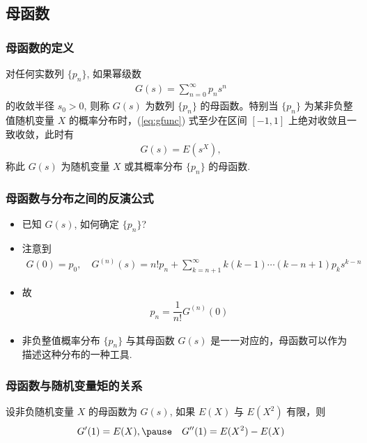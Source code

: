 \subsection{母函数}
\begin{frame}
	\frametitle{母函数的定义}
	\begin{defi}
		对任何实数列 $\{p_n\}$, 如果幂级数
		\begin{eqnarray}\label{eq:gfunc}
			G(s)=\sum_{n=0}^\infty p_ns^n
		\end{eqnarray}
		的收敛半径 $s_0>0$, 则称 $G (s)$ 为数列 $\{p_n\}$ 的母函数。特别当 $\{p_n\}$ 为某非负整值随机变量 $X$ 的概率分布时，(\ref{eq:gfunc}) 式至少在区间 $[-1,1]$ 上绝对收敛且一致收敛，此时有
		\begin{eqnarray*}
			G(s)=E(s^X),
		\end{eqnarray*}
		称此 $G (s)$ 为随机变量 $X$ 或其概率分布 $\{p_n\}$ 的母函数.
	\end{defi}
\end{frame}
\begin{frame}
	\frametitle{母函数与分布之间的反演公式}
	\begin{itemize}[<+-|alert@+>]
		\item 已知 $G (s)$, 如何确定 $\{p_n\}$?
		\item 注意到
		\begin{eqnarray*}
			G(0)=p_0, \quad G^{(n)}(s)=n! p_n+\sum_{k=n+1}^\infty k(k-1)\cdots(k-n+1)p_ks^{k-n}
		\end{eqnarray*}
		\item 故
		\begin{eqnarray*}
			p_n=\dfrac{1}{n!}G^{(n)}(0)
		\end{eqnarray*}
		\item 非负整值概率分布 $\{p_n\}$ 与其母函数 $G (s)$ 是一一对应的，母函数可以作为描述这种分布的一种工具.
	\end{itemize}
\end{frame}


\begin{frame}
	\frametitle{母函数与随机变量矩的关系}
	\begin{thm}
		设非负随机变量 $X$ 的母函数为 $G (s)$, 如果 $E (X)$ 与 $E (X^2)$ 有限，则
		\begin{eqnarray*}
			G'(1)=E(X),\pause \quad G''(1)=E(X^2)-E(X)
		\end{eqnarray*}

	\end{thm}

\end{frame}

